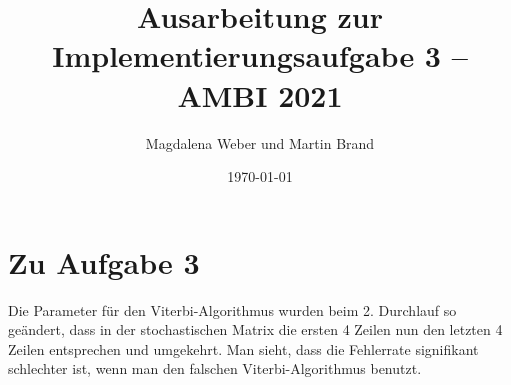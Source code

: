 \documentclass[a4paper,12pt]{article}
\begin{document}
\title{Ausarbeitung zur Implementierungsaufgabe 3 -- AMBI 2021}
\author
{Magdalena Weber und Martin Brand}
\date{\today}
\maketitle

\section*{Zu Aufgabe 3}
Die Parameter für den Viterbi-Algorithmus wurden beim 2. Durchlauf so geändert, dass in der stochastischen Matrix die ersten 4 Zeilen nun den letzten 4 Zeilen entsprechen und umgekehrt. Man sieht, dass die Fehlerrate signifikant schlechter ist, wenn man den falschen Viterbi-Algorithmus benutzt.
\end{document}
